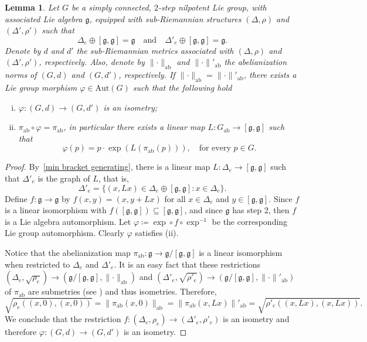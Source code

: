 \documentclass[a4paper,11pt,reqno]{amsart}
\theoremstyle{plain}
\newtheorem{lemma}[theorem]{Lemma}
\theoremstyle{definition}
\newcommand{\g}{\mathfrak{g}}
\newcommand{\vphi}{\varphi}
\newcommand{\coloneq}{\coloneqq}
\begin{document}
\begin{lemma} \label{same projection}
 Let $G$ be a simply connected, $2$-step nilpotent Lie group, with associated Lie algebra $\g$, equipped with sub-Riemannian structures $(\Delta,\rho)$ and $(\Delta',\rho')$ such that
 \begin{equation} \label{min bracket generating}
 \Delta_e \oplus [\g,\g] = \g \quad \text{and} \quad \Delta'_e \oplus [\g,\g] = \g.
 \end{equation}
 Denote by $d$ and $d'$ the sub-Riemannian metrics associated with $(\Delta,\rho)$ and $(\Delta',\rho')$, respectively. Also, denote by $\lVert \cdot \rVert_\mathrm{ab}$ and $\lVert \cdot \rVert'_\mathrm{ab}$ the abelianization norms of $(G,d)$ and $(G,d')$, respectively.
 If $\lVert \cdot \rVert_\mathrm{ab}=\lVert \cdot \rVert'_\mathrm{ab}$, there exists a Lie group morphism $\vphi \in \mathrm{Aut}(G)$ such that the following hold
 \begin{enumerate}[(i)]
 \item $\vphi:(G,d)\to(G,d')$ is an isometry;
 \item $\pi_\mathrm{ab} \circ \vphi = \pi_\mathrm{ab}$, in particular there exists a linear map $L \colon G_\mathrm{ab} \to [\g,\g]$ such that
 \begin{equation*}
 \vphi(p) = p \cdot \exp\left(L(\pi_\mathrm{ab}(p))\right), \quad \text{for every $p \in G$.}
 \end{equation*}
 \end{enumerate}
\end{lemma}
\begin{proof}
By~\eqref{min bracket generating}, there is a linear map $L:\Delta_e\to[\g,\g]$ such that $\Delta'_e$ is the graph of $L$, that is, 
\[
\Delta'_e = \{(x,Lx)\in \Delta_e \oplus [\g,\g] : x\in\Delta_e \} .
\]
Define $f:\g\to\g$ by $f(x,y) = (x,y+Lx)$ for all $x\in\Delta_e$ and $y\in[\g,\g]$.
Since $f$ is a linear isomorphism with $f([\g,\g])\subseteq[\g,\g]$, and since $\g$ has step 2, 
then $f$ is a Lie algebra automorphism.
Let $\vphi \coloneq \exp \circ f \circ \exp^{-1}$ be the corresponding Lie group automorphism.
Clearly $\vphi$ satisfies (ii).

Notice that the abelianization map $\pi_\mathrm{ab}:\g\to\g/[\g,\g]$ is a linear isomorphism when restricted to $\Delta_e$ and $\Delta'_e$.
It is an easy fact that these restrictions 
$(\Delta_e,\sqrt{\rho_e})\to (\g/[\g,\g],\lVert \cdot \rVert_\mathrm{ab})$
and $(\Delta'_e,\sqrt{\rho'_e})\to (\g/[\g,\g],\lVert \cdot \rVert'_\mathrm{ab})$
of $\pi_\mathrm{ab}$
are submetries (see \cite[Definition~10.1.1]{donne2024metricliegroupscarnotcaratheodory}) and thus isometries.
Therefore,
\[
\sqrt{\rho_e((x,0),(x,0))} = \lVert \pi_\mathrm{ab}(x,0)\rVert_\mathrm{ab}
= \lVert \pi_\mathrm{ab}(x,Lx) \rVert'_\mathrm{ab}
= \sqrt{\rho'_e((x,Lx),(x,Lx))} .
\]
We conclude that the restriction $f:(\Delta_e,\rho_e)\to(\Delta'_e,\rho'_e)$ is an isometry and therefore $\vphi:(G,d)\to(G,d')$ is an isometry.
\end{proof}
\end{document}
